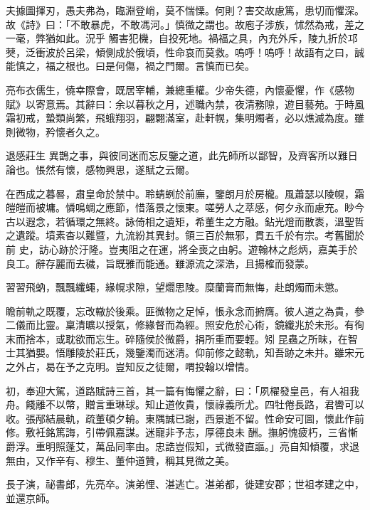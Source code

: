 \begin{pinyinscope}
 夫據圖揮刃，愚夫弗為，臨淵登峭，莫不惴慄。何則？害交故慮篤，患切而懼深。故《詩》曰：「不敢暴虎，不敢馮河。」慎微之謂也。故庖子涉族，怵然為戒，差之一毫，弊猶如此。況乎
 觸害犯機，自投死地。禍福之具，內充外斥，陵九折於邛僰，泛衝波於呂梁，傾側成於俄頃，性命哀而莫救。嗚呼！嗚呼！故語有之曰，誠能慎之，福之根也。曰是何傷，禍之門爾。言慎而已矣。



 亮布衣儒生，僥幸際會，既居宰輔，兼總重權。少帝失德，內懷憂懼，作《感物賦》以寄意焉。其辭曰：余以暮秋之月，述職內禁，夜清務隙，遊目藝苑。于時風霜初戒，蟄類尚繁，飛蛾翔羽，翩翾滿室，赴軒幌，集明燭者，必以燋滅為度。雖則微物，矜懷者久之。



 退感莊生
 異鵲之事，與彼同迷而忘反鑒之道，此先師所以鄙智，及齊客所以難日論也。悵然有懷，感物興思，遂賦之云爾。



 在西成之暮晷，肅皇命於禁中。聆蜻蛚於前廡，鑒朗月於房櫳。風蕭瑟以陵幌，霜皚皚而被墉。憐鳴蜩之應節，惜落景之懷東。嗟勞人之萃感，何夕永而慮充。眇今古以遐念，若循環之無終。詠倚相之遺矩，希董生之方融。鉆光燈而散袠，溫聖哲之遺蹤。墳素杳以難暨，九流紛其異封。領三百於無邪，貫五千於有宗。考舊聞於前
 史，訪心跡於汙隆。豈夷阻之在運，將全喪之由躬。遊翰林之彪炳，嘉美手於良工。辭存麗而去穢，旨既雅而能通。雖源流之深浩，且揚榷而發蒙。



 習習飛蚋，飄飄纖蠅，緣幌求隙，望爓思陵。糜蘭膏而無悔，赴朗燭而未懲。



 瞻前軌之既覆，忘改轍於後乘。匪微物之足悼，悵永念而捬膺。彼人道之為貴，參二儀而比靈。稟清曠以授氣，修緣督而為經。照安危於心術，鏡纖兆於未形。有徇末而捨本，或耽欲而忘生。碎隨侯於微爵，捐所重而要輕。矧
 昆蟲之所昧，在智士其猶嬰。悟雕陵於莊氏，幾鑒濁而迷清。仰前修之懿軌，知吾跡之未并。雖宋元之外占，曷在予之克明。豈知反之徒爾，喟投翰以增情。



 初，奉迎大駕，道路賦詩三首，其一篇有悔懼之辭，曰：「夙櫂發皇邑，有人祖我舟。餞離不以幣，贈言重琳球。知止道攸貴，懷祿義所尤。四牡倦長路，君轡可以收。張邴結晨軌，疏董頓夕輈。東隅誠已謝，西景逝不留。性命安可圖，懷此作前修。敷衽銘篤誨，引帶佩嘉謀。迷寵非予志，厚德良未
 酬。撫躬愧疲朽，三省慚爵浮。重明照蓬艾，萬品同率由。忠誥豈假知，式微發直謳。」亮自知傾覆，求退無由，又作辛有、穆生、董仲道贊，稱其見微之美。



 長子演，祕書郎，先亮卒。演弟悝、湛逃亡。湛弟都，徙建安郡；世祖孝建之中，並還京師。




\end{pinyinscope}
